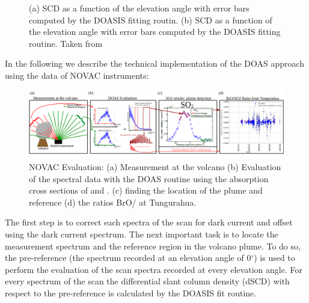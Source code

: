 \begin{figure}
	\caption{(a)  SCD as a function of the elevation angle with error bars computed by the DOASIS fitting routin. (b)  SCD as a function of the elevation angle with error bars computed by the DOASIS fitting routine.  Taken from \cite{WarnachSimon}}
	\label{fig:plumeref}
\end{figure}
%
In the following we describe the technical implementation of the DOAS approach using the data of NOVAC instruments:\\
\begin{figure}
	\centering
	\includegraphics[width=1\linewidth]{Bilder/NOVAC_Eval}
	\caption{NOVAC Evaluation: (a) Measurement at the volcano (b) Evaluation of the spectral data with the DOAS routine using the absorption cross sections of   and . (c) finding the location of the plume and reference (d) the ratios BrO/ at Tungurahua. }
	\label{fig:NOVAC_Eval}
\end{figure}
%
The first step is to correct each spectra of the scan for dark current and offset using the dark current spectrum.
The next important task is to locate the measurement spectrum and the reference region in the volcano plume. 
To do so, the pre-reference (the spectrum recorded at an elevation angle of  0$^{\circ} $) is used to perform the evaluation of the scan spectra recorded at every elevation angle.
For every spectrum of the scan the  differential slant column density (dSCD) with respect to the pre-reference is calculated by the DOASIS fit routine.

